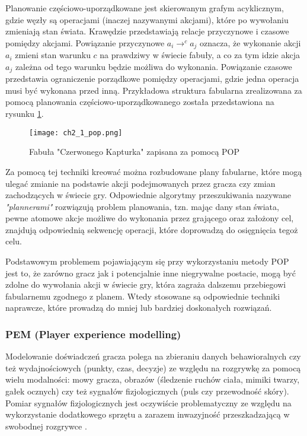 Planowanie częściowo-uporządkowane jest skierowanym grafym acyklicznym, gdzie węzły są operacjami
(inaczej nazywanymi akcjami), które po wywołaniu zmieniają stan świata. Krawędzie przedstawiają
relacje przyczynowe i czasowe pomiędzy akcjami. Powiązanie przyczynowe $a_{i} \rightarrow^{c}a_{j}$
oznacza, że wykonanie akcji $a_{i}$ zmieni stan warunku $c$ na prawdziwy w świecie fabuły, a co za
tym idzie akcja $a_{j}$ zależna od tego warunku będzie możliwa do wykonania. Powiązanie czasowe
przedstawia ograniczenie porządkowe pomiędzy operacjami, gdzie jedna operacja musi być wykonana przed
inną\cite{game_ai_storytelling}. Przykładowa struktura fabularna zrealizowana za pomocą planowania
częściowo-uporządkowanego została przedstawiona na rysunku \ref{fig:ch2_1_pop}.

\begin{figure}[h]
    \centering
    \texttt{[image: ch2\_1\_pop.png]}
    \caption{Fabuła "Czerwonego Kapturka" zapisana za pomocą POP}
    \label{fig:ch2_1_pop}
\end{figure}

Za pomocą tej techniki kreować można rozbudowane plany fabularne, które mogą ulegać zmianie na
podstawie akcji podejmowanych przez gracza czy zmian zachodzących w świecie gry. Odpowiednie algorytmy
przeszukiwania nazywane \textit{"plannerami"} rozwiązują problem planowania, tzn. mając dany stan
świata, pewne atomowe akcje możliwe do wykonania przez grającego oraz założony cel, znajdują
odpowiednią sekwencję operacji, które doprowadzą do osięgnięcia tegoż celu\cite{game_ai_storytelling}.

Podstawowym problemem pojawiającym się przy wykorzystaniu metody POP jest to, że zarówno gracz jak i
potencjalnie inne niegrywalne postacie, mogą być zdolne do wywołania akcji w świecie gry, która
zagraża dalszemu przebiegowi fabularnemu zgodnego z planem\cite{characters_and_directors}. Wtedy
stosowane są odpowiednie techniki naprawcze, które prowadzą do mniej lub bardziej doskonałych rozwiązań.

\subsubsection*{PEM (Player experience modelling)}

Modelowanie doświadczeń gracza polega na zbieraniu danych behawioralnych czy też wydajnościowych
(punkty, czas, decyzje) ze względu na rozgrywkę za pomocą wielu modalności: mowy gracza, obrazów
(śledzenie ruchów ciała, mimiki twarzy, gałek ocznych) czy też sygnałów fizjologicznych (puls czy
przewodność skóry). Pomiar sygnałów fizjologicznych jest oczywiście problematyczny ze względu na
wykorzystanie dodatkowego sprzętu a zarazem inwazyjność przeszkadzającą w swobodnej rozgrywce
\cite{reusable_game_ai}.

